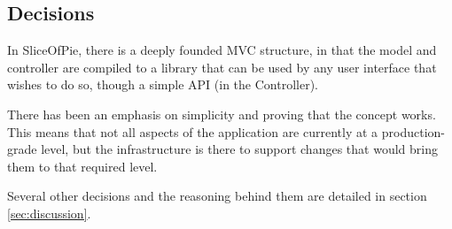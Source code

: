 \subsection{Decisions}

In SliceOfPie, there is a deeply founded MVC structure, in that the model and controller are
compiled to a library that can be used by any user interface that wishes to do so, though a
simple API (in the Controller).

There has been an emphasis on simplicity and proving that the concept works. This means that
not all aspects of the application are currently at a production-grade level, but the infrastructure
is there to support changes that would bring them to that required level.

Several other decisions and the reasoning behind them are detailed in section \ref{sec:discussion}.